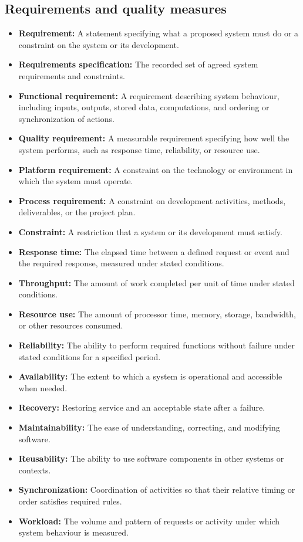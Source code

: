 \documentclass[11pt]{article}
\newenvironment{DottedList}{%
  \begin{itemize}[leftmargin=2em, itemsep=0.35em, topsep=0.35em, label=\textbullet]
}{%
  \end{itemize}
}
\begin{document}
\subsection*{Requirements and quality measures}
\begin{DottedList}
  \item \textbf{Requirement:} A statement specifying what a proposed system must do or a constraint on the system or its development.
  \item \textbf{Requirements specification:} The recorded set of agreed system requirements and constraints.
  \item \textbf{Functional requirement:} A requirement describing system behaviour, including inputs, outputs, stored data, computations, and ordering or synchronization of actions.
  \item \textbf{Quality requirement:} A measurable requirement specifying how well the system performs, such as response time, reliability, or resource use.
  \item \textbf{Platform requirement:} A constraint on the technology or environment in which the system must operate.
  \item \textbf{Process requirement:} A constraint on development activities, methods, deliverables, or the project plan.
  \item \textbf{Constraint:} A restriction that a system or its development must satisfy.
  \item \textbf{Response time:} The elapsed time between a defined request or event and the required response, measured under stated conditions.
  \item \textbf{Throughput:} The amount of work completed per unit of time under stated conditions.
  \item \textbf{Resource use:} The amount of processor time, memory, storage, bandwidth, or other resources consumed.
  \item \textbf{Reliability:} The ability to perform required functions without failure under stated conditions for a specified period.
  \item \textbf{Availability:} The extent to which a system is operational and accessible when needed.
  \item \textbf{Recovery:} Restoring service and an acceptable state after a failure.
  \item \textbf{Maintainability:} The ease of understanding, correcting, and modifying software.
  \item \textbf{Reusability:} The ability to use software components in other systems or contexts.
  \item \textbf{Synchronization:} Coordination of activities so that their relative timing or order satisfies required rules.
  \item \textbf{Workload:} The volume and pattern of requests or activity under which system behaviour is measured.
\end{DottedList}
\end{document}
